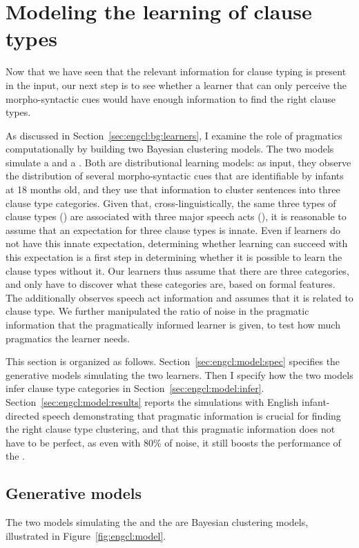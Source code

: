 \section{Modeling the learning of clause types}
\label{sec:engcl:model}
Now that we have seen that the relevant information for clause typing is present in the input, our next step is to see whether a learner that can only perceive the morpho-syntactic cues would have enough information to find the right clause types. 

As discussed in Section~\ref{sec:engcl:bg:learners}, I examine the role of pragmatics computationally by building two Bayesian clustering models. The two models simulate a \distlearner{} and a \praglearner{}. Both are distributional learning models: as input, they observe the distribution of several morpho-syntactic cues that are identifiable by infants at 18 months old, and they use that information to cluster sentences into three clause type categories. Given that, cross-linguistically, the same three types of clause types (\diis{}) are associated with three major speech acts (\aqrs{}), it is reasonable to assume that an expectation for three clause types is innate. Even if learners do not have this innate expectation, determining whether learning can succeed with this expectation is a first step in determining whether it is possible to learn the clause types without it. Our learners thus assume that there are three categories, and only have to discover what these categories are, based on formal features. The \praglearner{} additionally observes speech act information and assumes that it is related to clause type. We further manipulated the ratio of noise in the pragmatic information that the pragmatically informed learner is given, to test how much pragmatics the learner needs.


This section is organized as follows. Section~\ref{sec:engcl:model:spec} specifies the generative models simulating the two learners. Then I specify how the two models infer clause type categories in Section~\ref{sec:engcl:model:infer}. Section~\ref{sec:engcl:model:results} reports the simulations with English infant-directed speech demonstrating that pragmatic information is crucial for finding the right clause type clustering, and that this pragmatic information does not have to be perfect, as even with 80\% of noise, it still boosts the performance of the \praglearner{}. 

\subsection{Generative models}
The two models simulating the \distlearner{} and the \praglearner{} are Bayesian clustering models, illustrated in Figure~\ref{fig:engcl:model}.%

